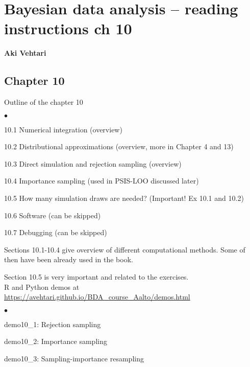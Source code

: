 \documentclass[a4paper,11pt,english]{article}
\begin{document}
\thispagestyle{empty}

\section*{Bayesian data analysis -- reading instructions ch 10} 
\smallskip
{\bf Aki Vehtari}
\smallskip

\subsection*{Chapter 10}

Outline of the chapter 10
\begin{list}{$\bullet$}{\parsep=0pt\itemsep=2pt}
\item 10.1 Numerical integration (overview)
\item 10.2 Distributional approximations (overview, more in Chapter 4 and 13)
\item 10.3 Direct simulation and rejection sampling (overview)
\item 10.4 Importance sampling (used in PSIS-LOO discussed later)
\item 10.5 How many simulation draws are needed? (Important! Ex 10.1 and 10.2)
\item {\color{gray}10.6 Software (can be skipped)}
\item {\color{gray}10.7 Debugging (can be skipped)}
\end{list}

Sections 10.1-10.4 give overview of different computational
methods. Some of then have been already used in the book.

Section 10.5 is very important and related to the exercises.\\

R and Python demos at \url{https://avehtari.github.io/BDA_course_Aalto/demos.html}
\begin{list}{$\bullet$}{\parsep=0pt\itemsep=2pt}
\item demo10\_1: Rejection sampling
\item demo10\_2: Importance sampling
\item demo10\_3: Sampling-importance resampling
\end{list}
\end{document}
